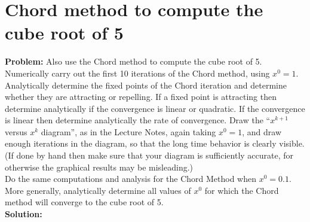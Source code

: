 \newpage
\section{Chord method to compute the cube root of 5}%
\label{sec:chord_method_to_compute_the_cube_root_of_5}

\textbf{Problem:}
Also use the Chord method to compute the cube root of 5.
Numerically carry out the first 10 iterations of the Chord method, using $x^{0} = 1$. 
Analytically determine the fixed points of the Chord iteration and determine whether they are attracting or repelling.
If a fixed point is attracting then determine analytically if the convergence is linear or quadratic.
If the convergence is linear then determine analytically the rate of convergence.
Draw the “$x^{k+1}$ versus $x^{k}$ diagram”, as in the Lecture Notes, again taking $x^{0} = 1$, and draw enough iterations in the diagram, so that the long time behavior is clearly visible.
(If done by hand then make sure that your diagram is sufficiently accurate, for otherwise the graphical results may be misleading.)
\\
Do the same computations and analysis for the Chord Method when $x^{0} = 0.1$.
\\
More generally, analytically determine all values of $x^{0}$ for which the Chord method will converge to the cube root of 5.
\\
\textbf{Solution:}

\newpage
